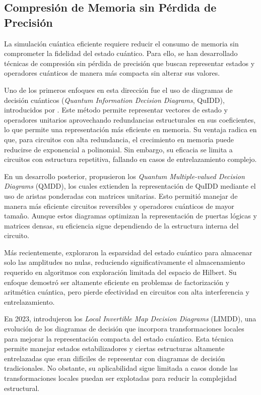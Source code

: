 \subsection{Compresión de Memoria sin Pérdida de Precisión}
La simulación cuántica eficiente requiere reducir el consumo de memoria sin
comprometer la fidelidad del estado cuántico. Para ello, se han desarrollado
técnicas de compresión sin pérdida de precisión que buscan representar estados
y operadores cuánticos de manera más compacta sin alterar sus valores.

Uno de los primeros enfoques en esta dirección fue el uso de diagramas de decisión
cuánticos (\textit{Quantum Information Decision Diagrams}, QuIDD),
introducidos por \textcite{Viamontes2003}. Este método permite representar
vectores de estado y operadores unitarios aprovechando redundancias
estructurales en sus coeficientes, lo que permite una representación más eficiente
en memoria. Su ventaja radica en que, para circuitos con alta redundancia, el
crecimiento en memoria puede reducirse de exponencial a polinomial. Sin embargo,
su eficacia se limita a circuitos con estructura repetitiva, fallando en casos
de entrelazamiento complejo.

En un desarrollo posterior, \textcite{Miller2006} propusieron los \textit{Quantum
Multiple-valued Decision Diagrams} (QMDD), los cuales extienden la
representación de QuIDD mediante el uso de aristas ponderadas con matrices
unitarias. Esto permitió manejar de manera más eficiente circuitos reversibles
y operadores cuánticos de mayor tamaño. Aunque estos diagramas optimizan la
representación de puertas lógicas y matrices densas, su eficiencia sigue dependiendo
de la estructura interna del circuito.

Más recientemente, \textcite{Jaques2022} exploraron la esparsidad del estado
cuántico para almacenar solo las amplitudes no nulas, reduciendo significativamente
el almacenamiento requerido en algoritmos con exploración limitada del espacio
de Hilbert. Su enfoque demostró ser altamente eficiente en problemas de
factorización y aritmética cuántica, pero pierde efectividad en circuitos con alta
interferencia y entrelazamiento.

En 2023, \textcite{Vinkhuijzen2023} introdujeron los \textit{Local Invertible
Map Decision Diagrams} (LIMDD), una evolución de los diagramas de decisión que
incorpora transformaciones locales para mejorar la representación compacta del
estado cuántico. Esta técnica permite manejar estados estabilizadores y ciertas
estructuras altamente entrelazadas que eran difíciles de representar con diagramas
de decisión tradicionales. No obstante, su aplicabilidad sigue limitada a casos
donde las transformaciones locales puedan ser explotadas para reducir la complejidad
estructural.

